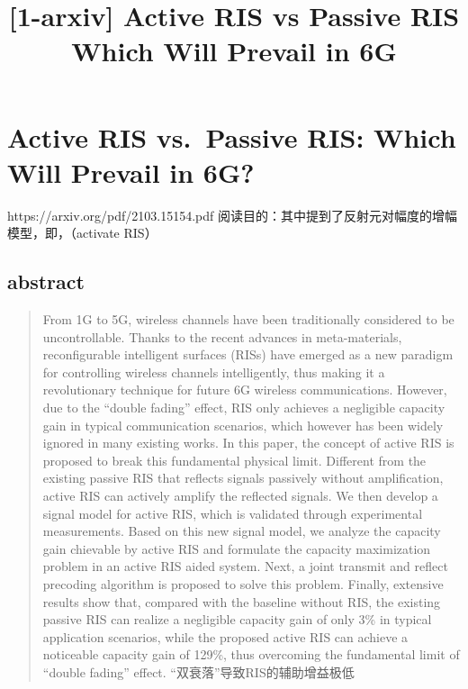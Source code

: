 \documentclass[UTF8]{ctexart}
\title{[1-arxiv] Active RIS vs Passive RIS Which Will Prevail in 6G}
\begin{document}
    
    \maketitle
    
    

    
    \hypertarget{active-ris-vs.-passive-ris-which-will-prevail-in-6g}{%
\section{Active RIS vs.~Passive RIS: Which Will Prevail in
6G?}\label{active-ris-vs.-passive-ris-which-will-prevail-in-6g}}

https://arxiv.org/pdf/2103.15154.pdf
阅读目的：其中提到了反射元对幅度的增幅模型，即，（activate RIS）

    \hypertarget{abstract}{%
\subsection{abstract}\label{abstract}}

\begin{quote}
From 1G to 5G, wireless channels have been traditionally considered to
be uncontrollable. Thanks to the recent advances in meta-materials,
reconfigurable intelligent surfaces (RISs) have emerged as a new
paradigm for controlling wireless channels intelligently, thus making it
a revolutionary technique for future 6G wireless communications.
However, due to the ``double fading'' effect, RIS only achieves a
negligible capacity gain in typical communication scenarios, which
however has been widely ignored in many existing works. In this paper,
the concept of active RIS is proposed to break this fundamental physical
limit. Different from the existing passive RIS that reflects signals
passively without amplification, active RIS can actively amplify the
reflected signals. We then develop a signal model for active RIS, which
is validated through experimental measurements. Based on this new signal
model, we analyze the capacity gain chievable by active RIS and
formulate the capacity maximization problem in an active RIS aided
system. Next, a joint transmit and reflect precoding algorithm is
proposed to solve this problem. Finally, extensive results show that,
compared with the baseline without RIS, the existing passive RIS can
realize a negligible capacity gain of only 3\% in typical application
scenarios, while the proposed active RIS can achieve a noticeable
capacity gain of 129\%, thus overcoming the fundamental limit of
``double fading'' effect. ``双衰落''导致RIS的辅助增益极低
\end{quote}
\end{document}

